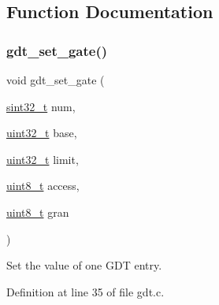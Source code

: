 \subsection{Function Documentation}
\mbox{\label{a00065_abcf0775ea602ace125ae809475b6d8bf_abcf0775ea602ace125ae809475b6d8bf}} 
\subsubsection{\texorpdfstring{gdt\+\_\+set\+\_\+gate()}{gdt\_set\_gate()}}
{\footnotesize\ttfamily void gdt\+\_\+set\+\_\+gate (\begin{DoxyParamCaption}\item[{\hyperlink{a00101_ad838970452fe561cb8e0550cac5336be_ad838970452fe561cb8e0550cac5336be}{sint32\+\_\+t}}]{num,  }\item[{\hyperlink{a00101_a435d1572bf3f880d55459d9805097f62_a435d1572bf3f880d55459d9805097f62}{uint32\+\_\+t}}]{base,  }\item[{\hyperlink{a00101_a435d1572bf3f880d55459d9805097f62_a435d1572bf3f880d55459d9805097f62}{uint32\+\_\+t}}]{limit,  }\item[{\hyperlink{a00101_aba7bc1797add20fe3efdf37ced1182c5_aba7bc1797add20fe3efdf37ced1182c5}{uint8\+\_\+t}}]{access,  }\item[{\hyperlink{a00101_aba7bc1797add20fe3efdf37ced1182c5_aba7bc1797add20fe3efdf37ced1182c5}{uint8\+\_\+t}}]{gran }\end{DoxyParamCaption})}



Set the value of one G\+DT entry. 



Definition at line 35 of file gdt.\+c.


